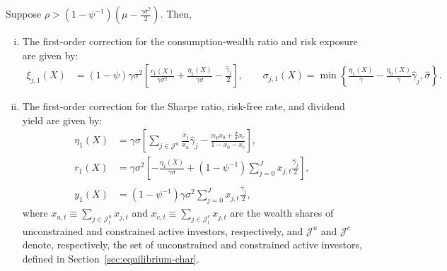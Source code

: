 \begin{prop}\label{prop:first_order}
Suppose $\rho>\left(1-\psi^{-1}\right)\left( \mu - \frac{\gamma
\sigma^2}{2}  \right)$.
Then,
\begin{enumerate}[(i)]
    \item The first-order correction for the consumption-wealth ratio and risk exposure are given by:
    \begin{align*}
        \xi_{j,1}(X) &= (1-\psi) \gamma\sigma^{2}\left[\frac{r_{1}(X)}{\gamma\sigma^{2}}+\frac{\eta_{1}(X)}{\gamma\sigma}-\frac{\hat{\gamma}_{j}}{2}\right], \qquad 
        \sigma_{j,1}(X) = \min \left\{\frac{\eta_{1}(X)}{\gamma}-\frac{\eta_{0}(X)}{\gamma} \hat{\gamma}_{j}, \hat{\sigma}\right\}.
    \end{align*}    
    \item The first-order correction for the Sharpe ratio, risk-free rate, and dividend yield are given by:
    \begin{align*}
        \eta_{1}(X) &=\gamma \sigma \left[\sum_{j\in\mathcal{J}^u} \frac{x_j}{x_u} \hat{\gamma}_j -\frac{\hat{\alpha}_p  x_0+\frac{\hat{\sigma}}{\sigma} x_c }{1-x_0-x_c}\right],\\
        r_1(X) &=\gamma\sigma^{2}\left[-\frac{\eta_{1}(X)}{\gamma\sigma}+\left(1-\psi^{-1}\right) \sum_{j=0}^{J} x_{j, t} \frac{\hat{\gamma}_{j}}{2}\right],\\
        y_1(X) &=  \left(1-\psi^{-1}\right) \gamma \sigma^2 \sum_{j=0}^J x_{j,t}\frac{\hat{\gamma}_j}{2},
    \end{align*}
    where $x_{u,t} \equiv \sum_{j\in \mathcal{J}_t^u} x_{j,t}$ and $x_{c,t} \equiv \sum_{j\in \mathcal{J}_t^c} x_{j,t}$ are the wealth shares of unconstrained and constrained active investors, respectively, and $\mathcal{J}^u $ and $\mathcal{J}^c $ denote, respectively, the set of unconstrained and constrained active investors, defined in Section~\ref{sec:equilibrium-char}. 
\end{enumerate}
\end{prop}
